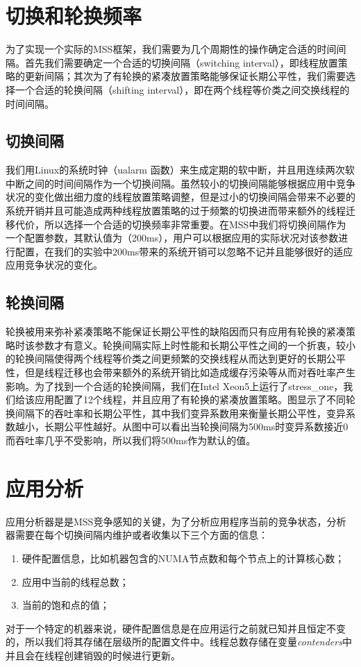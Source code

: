 \section{切换和轮换频率}
为了实现一个实际的MSS框架，我们需要为几个周期性的操作确定合适的时间间隔。首先我们需要确定一个合适的切换间隔（switching interval），即线程放置策略的更新间隔；其次为了有轮换的紧凑放置策略能够保证长期公平性，我们需要选择一个合适的轮换间隔（shifting interval），即在两个线程等价类之间交换线程的时间间隔。

\subsection{切换间隔}
我们用Linux的系统时钟（ualarm 函数）来生成定期的软中断，并且用连续两次软中断之间的时间间隔作为一个切换间隔。虽然较小的切换间隔能够根据应用中竞争状况的变化做出细力度的线程放置策略调整，但是过小的切换间隔会带来不必要的系统开销并且可能造成两种线程放置策略的过于频繁的切换进而带来额外的线程迁移代价，所以选择一个合适的切换频率非常重要。在MSS中我们将切换间隔作为一个配置参数，其默认值为（200ms），用户可以根据应用的实际状况对该参数进行配置，在我们的实验中200ms带来的系统开销可以忽略不记并且能够很好的适应应用竞争状况的变化。
\subsection{轮换间隔}
轮换被用来弥补紧凑策略不能保证长期公平性的缺陷因而只有应用有轮换的紧凑策略时该参数才有意义。轮换间隔实际上时性能和长期公平性之间的一个折衷，较小的轮换间隔使得两个线程等价类之间更频繁的交换线程从而达到更好的长期公平性，但是线程迁移也会带来额外的系统开销比如造成缓存污染等从而对吞吐率产生影响。为了找到一个合适的轮换间隔，我们在Intel Xeon5上运行了stress\_one，我们给该应用配置了12个线程，并且应用了有轮换的紧凑放置策略。图显示了不同轮换间隔下的吞吐率和长期公平性，其中我们变异系数用来衡量长期公平性，变异系数越小，长期公平性越好。从图中可以看出当轮换间隔为500ms时变异系数接近0而吞吐率几乎不受影响，所以我们将500ms作为默认的值。

\section{应用分析}
应用分析器是是MSS竞争感知的关键，为了分析应用程序当前的竞争状态，分析器需要在每个切换间隔内维护或者收集以下三个方面的信息：
\begin{enumerate}
  \item 硬件配置信息，比如机器包含的NUMA节点数和每个节点上的计算核心数；
  \item 应用中当前的线程总数；
  \item 当前的饱和点的值；
\end{enumerate}
对于一个特定的机器来说，硬件配置信息是在应用运行之前就已知并且恒定不变的，所以我们将其存储在层级所的配置文件中。线程总数存储在变量\emph{contenders}中并且会在线程创建销毁的时候进行更新。

